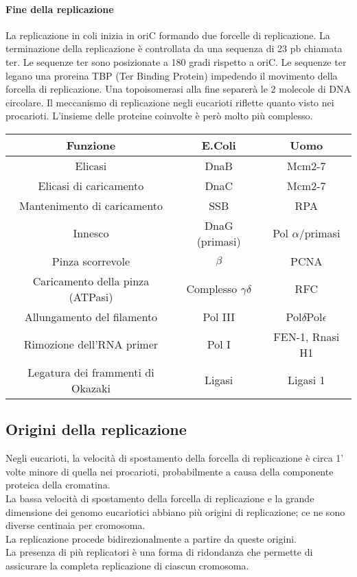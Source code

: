 \documentclass{article}
\begin{document}
\paragraph{Fine della replicazione}La replicazione in coli inizia in oriC formando due forcelle di replicazione. 
La terminazione della replicazione è controllata da una sequenza di 23 pb chiamata ter. Le sequenze ter sono posizionate a 180 gradi rispetto a oriC. 
Le sequenze ter legano una proreina TBP (Ter Binding Protein) impedendo il movimento della forcella di replicazione. 
Una topoisomerasi alla fine separerà le 2 molecole di DNA circolare.
Il meccanismo di replicazione negli eucarioti riflette quanto visto nei procarioti. 
L'insieme delle proteine coinvolte è però molto più complesso.
\begin{center}
    \begin{tabular}{c|c|c}
    \toprule
    Funzione & E.Coli & Uomo \\
    \midrule
    Elicasi & DnaB & Mcm2-7 \\
    Elicasi di caricamento & DnaC & Mcm2-7 \\
    Mantenimento di caricamento & SSB & RPA \\
    Innesco & DnaG (primasi) & Pol $ \alpha $/primasi \\
    Pinza scorrevole & $\beta$ & PCNA \\
    Caricamento della pinza (ATPasi) & Complesso $\gamma\delta$ & RFC \\
    Allungamento del filamento & Pol III & Pol$\delta$Pol$\epsilon$ \\
    Rimozione dell'RNA primer & Pol I & FEN-1, Rnasi H1 \\
    Legatura dei frammenti di Okazaki & Ligasi & Ligasi 1 \\
    \bottomrule
    \end{tabular}
    \end{center}
\subsection{Origini della replicazione}Negli eucarioti, la velocità di spostamento della forcella di replicazione è circa 1' volte minore di quella nei procarioti,
probabilmente a causa della componente proteica della cromatina.\\
La bassa velocità di spostamento della forcella di replicazione e la grande dimensione dei genomo eucariotici abbiano più origini di replicazione; ce ne sono diverse centinaia per cromosoma.\\
La replicazione procede bidirezionalmente a partire da queste origini.\\
La presenza di più replicatori è una forma di ridondanza che permette di assicurare la completa replicazione di ciascun cromosoma.
\end{document}
